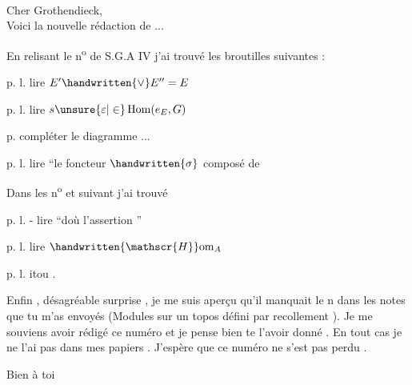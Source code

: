 \begin{flushright}
\\
\end{flushright}
Cher Grothendieck,\\

Voici la nouvelle rédaction de ...

En relisant le n\textsuperscript{o}  de S.G.A  IV j'ai trouvé les broutilles suivantes :

p.  l.  lire \(E'\handwritten{\vee} E'' = E\)

p.  l.  lire \(s\unsure{\varepsilon|\in}\operatorname{Hom}(e_E,G)\)

p.  compléter le diagramme ...

p.  l.  lire ``le foncteur \(\handwritten{\sigma}\) composé de

Dans les n\textsuperscript{o}  et suivant j'ai trouvé

p.  l. - lire ``doù l'assertion ''

p.  l.  lire \(\handwritten{\mathscr{H}}\mathrm{om}_A\)

p. l.  itou .

Enfin , désagréable surprise , je me suis aperçu qu'il manquait le n  dans les notes que tu m'as envoyés (Modules sur un topos défini par recollement ). Je me souviens avoir rédigé ce numéro et je pense bien te l'avoir donné . En tout cas je ne l'ai pas dans mes papiers . J'espère que ce numéro ne s'est pas perdu .

\begin{flushright}
Bien à toi\\
\\
\end{flushright}
